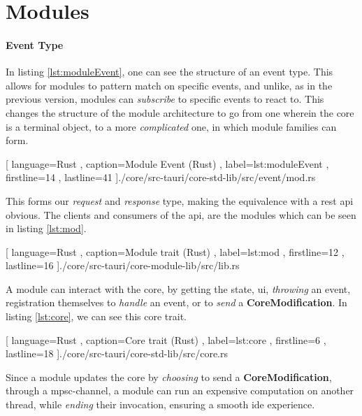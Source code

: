 \section{Modules}

\paragraph{Event Type} In listing \ref{lst:moduleEvent}, one can see the
structure of an event type. This allows for modules to pattern match on specific
events, and unlike, as in the previous version, modules can \textit{subscribe}
to specific events to react to. This changes the structure of the module
architecture to go from one wherein the core is a terminal object, to a more
\textit{complicated} one, in which module families can form.

\begin{center}
  
    [ language=Rust
    , caption={Module Event (Rust)}
    , label=lst:moduleEvent
    , firstline=14
    , lastline=41
    ]{./core/src-tauri/core-std-lib/src/event/mod.rs}
\end{center}

This forms our \textit{request} and \textit{response} type, making the
equivalence with a \gls{rest} \gls{api} obvious. The clients and consumers
of the \gls{api}, are the modules which can be seen in listing \ref{lst:mod}.

\begin{center}
  
    [ language=Rust
    , caption={Module trait (Rust)}
    , label=lst:mod
    , firstline=12
    , lastline=16
    ]{./core/src-tauri/core-module-lib/src/lib.rs}
\end{center}

A module can interact with the core, by getting the state, \gls{ui},
\textit{throwing} an event, registration themselves to \textit{handle} an
event, or to \textit{send} a \textbf{CoreModification}. In listing
\ref{lst:core}, we can see this core trait.

\begin{center}
  
    [ language=Rust
    , caption={Core trait (Rust)}
    , label=lst:core
    , firstline=6
    , lastline=18
    ]{./core/src-tauri/core-std-lib/src/core.rs}
\end{center}

Since a module updates the core by \textit{choosing} to send a
\textbf{CoreModification}, through a \gls{mpsc}-channel, a module can run an
expensive computation on another thread, while \textit{ending} their
invocation, ensuring a smooth \gls{ide} experience.


